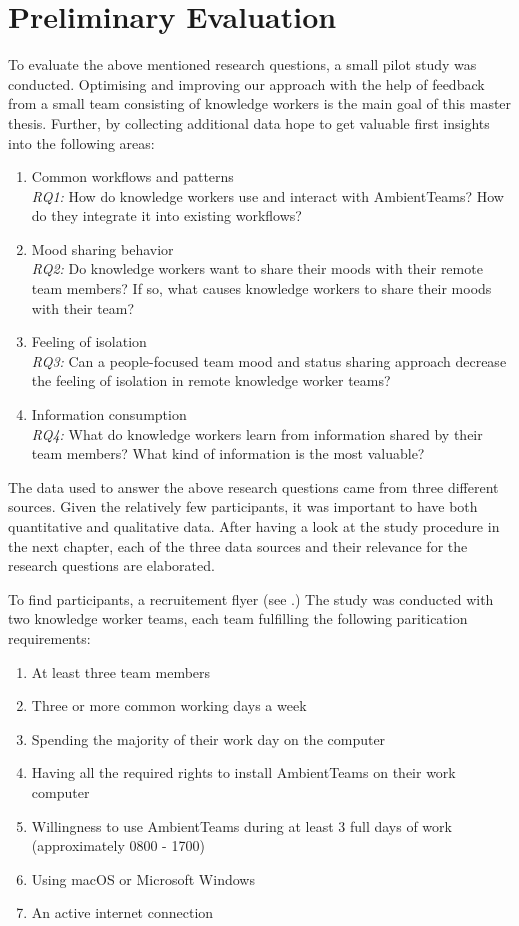 \chapter{Preliminary Evaluation}
To evaluate the above mentioned research questions, a small pilot study was conducted. Optimising and improving our approach with the help of feedback from a small team consisting of knowledge workers is the main goal of this master thesis. Further, by collecting additional data hope to get valuable first insights into the following areas:

\begin{enumerate}
    \item Common workflows and patterns \\
          \textit{RQ1:} How do knowledge workers use and interact with AmbientTeams? How do they integrate it into existing workflows?
    \item Mood sharing behavior \\
          \textit{RQ2:} Do knowledge workers want to share their moods with their remote team members? If so, what causes knowledge workers to share their moods with their team?
    \item Feeling of isolation \\
          \textit{RQ3:} Can a people-focused team mood and status sharing approach decrease the feeling of isolation in remote knowledge worker teams?
    \item Information consumption \\
          \textit{RQ4:} What do knowledge workers learn from information shared by their team members? What kind of information is the most valuable?
\end{enumerate}

The data used to answer the above research questions came from three different sources. Given the relatively few participants, it was important to have both quantitative and qualitative data. After having a look at the study procedure in the next chapter, each of the three data sources and their relevance for the research questions are elaborated.

To find participants, a recruitement flyer (see .) The study was conducted with two knowledge worker teams, each team fulfilling the following paritication requirements:

\begin{enumerate}
    \item At least three team members
    \item Three or more common working days a week
    \item Spending the majority of their work day on the computer
    \item Having all the required rights to install AmbientTeams on their work computer
    \item Willingness to use AmbientTeams during at least 3 full days of work (approximately 0800 - 1700)
    \item Using macOS or Microsoft Windows
    \item An active internet connection
\end{enumerate}


